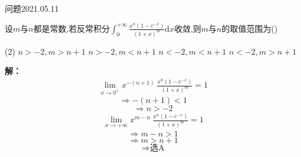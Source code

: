 \begin{mybox}{问题2021.05.11}
	
	\qquad 设$m$与$n$都是常数,若反常积分$\int_{0}^{+\infty} \frac{x^n(1-e^{-x})}{(1+x)^m}\mathrm{d}x $收敛,则$m$与$n$的取值范围为()\begin{tasks}(2)
		\task $n>-2,m>n+1$
		\task $n>-2,m<n+1$
		\task $n<-2,m<n+1$
		\task $n<-2,m>n+1$
	\end{tasks}
\end{mybox}
\noindent
\textbf{解：}
\begin{align*}
	\lim \limits_{x \to 0^{+}} x^{-(n+1)}\: \frac{x^n(1-e^{-x})}{(1+x)^m}=1
\end{align*}
$$\Rightarrow -(n+1)<1$$
$$\Rightarrow n>-2$$
\begin{align*}
	\lim \limits_{x \to +\infty} x^{m-n}\:\frac{x^n(1-e^{-x})}{(1+x)^m}=1
\end{align*}
$$\Rightarrow m-n>1$$
$$\Rightarrow m>n+1$$
$$\Rightarrow \text{选A}$$